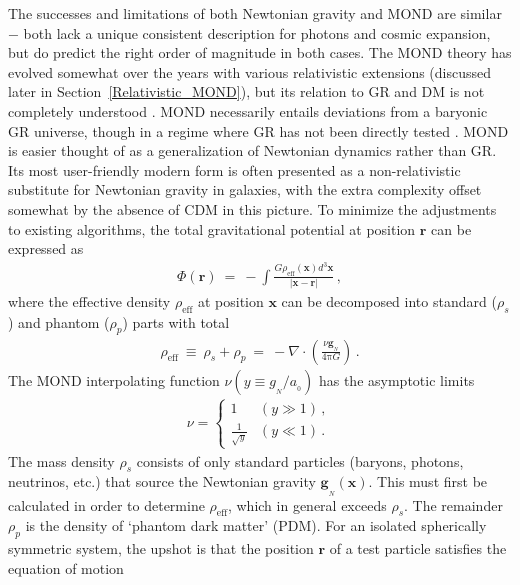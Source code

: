 \documentclass[fleqn,usenatbib,useAMS,onecolumn]{mnras} %
\begin{document}
The successes and limitations of both Newtonian gravity and MOND are similar $-$ both lack a unique consistent description for photons and cosmic expansion, but do predict the right order of magnitude in both cases. The MOND theory has evolved somewhat over the years with various relativistic extensions (discussed later in Section~\ref{Relativistic_MOND}), but its relation to GR and DM is not completely understood \citep[for a historical review, see][]{Sanders_2015}. MOND necessarily entails deviations from a baryonic GR universe, though in a regime where GR has not been directly tested \citep{Baker_2015}. MOND is easier thought of as a generalization of Newtonian dynamics rather than GR. Its most user-friendly modern form \citep[called quasi-linear MOND or QUMOND;][]{QUMOND} is often presented as a non-relativistic substitute for Newtonian gravity in galaxies, with the extra complexity offset somewhat by the absence of CDM in this picture. To minimize the adjustments to existing algorithms, the total gravitational potential at position $\bm{r}$ can be expressed as
\begin{eqnarray}
	\Phi \left( \bm{r} \right) ~=~ -\int \! \frac{G \rho_{\text{eff}} \left( \bm{x} \right) d^3\bm{x}}{\left| \bm{x} - \bm{r} \right|} \, ,
	\label{Phi_QUMOND}
\end{eqnarray}
where the effective density $\rho_{\text{eff}}$ at position $\bm{x}$ can be decomposed into standard ($\rho_s$) and phantom ($\rho_p$) parts with total
\begin{eqnarray}
	\rho_{\text{eff}} ~\equiv~ \rho_s + \rho_p ~=~ -\nabla \cdot \left( \frac{\nu\bm{g}_{_N}}{4 \mathrm{\pi} G} \right) \, .
	\label{rho_eff_QUMOND}
\end{eqnarray}
The MOND interpolating function $\nu \left( y \equiv g_{_N}/a_{_0} \right)$ has the asymptotic limits
\begin{eqnarray}
	\nu =
\left\{
	\begin{array}{ll}
		1 & \left( y \gg 1 \right) \, ,\\
		\frac{1}{\sqrt{y}} & \left( y \ll 1 \right) \, .
	\end{array}
	\label{nu_asymptotic}
\right.
\end{eqnarray}
The mass density $\rho_s$ consists of only standard particles (baryons, photons, neutrinos, etc.) that source the Newtonian gravity $\bm{g}_{_N} \left( \bm{x} \right)$. This must first be calculated in order to determine $\rho_{\text{eff}}$, which in general exceeds $\rho_s$. The remainder $\rho_p$ is the density of `phantom dark matter' (PDM). For an isolated spherically symmetric system, the upshot is that the position $\bm{r}$ of a test particle satisfies the equation of motion
\end{document}
